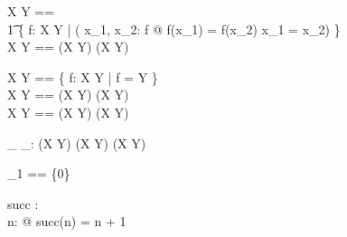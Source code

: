 \documentclass[11pt,a4paper]{article}
\begin{document}


\begin{zed}
	X \pinj Y == \\
	\t1	\{ f: X \pfun Y | ( \forall x_1, x_2: \dom f @
			f(x_1) = f(x_2) \implies x_1 = x_2) \} \\
	X \inj Y == (X \pinj Y) \cap (X \fun Y)
\end{zed}


\begin{zed}
	X \psurj Y == \{ f: X \pfun Y | \ran f = Y \} \\
	X \surj Y == (X \psurj Y) \cap (X \fun Y) \\
	X \bij Y == (X \surj Y) \cap (X \inj Y) \\
\end{zed}


\begin{gendef}[X, Y]
	\_ \oplus \_: (X \pfun Y) \cross (X \pfun Y) \fun (X \pfun Y) \\
\end{gendef}





\begin{zed}
	\nat_1 == \nat \setminus \{0\}
\end{zed}

\begin{axdef}
	succ : \nat \fun \nat \\
\where
	\forall n: \nat @ succ(n) = n + 1 \\
\end{axdef}
\end{document}
